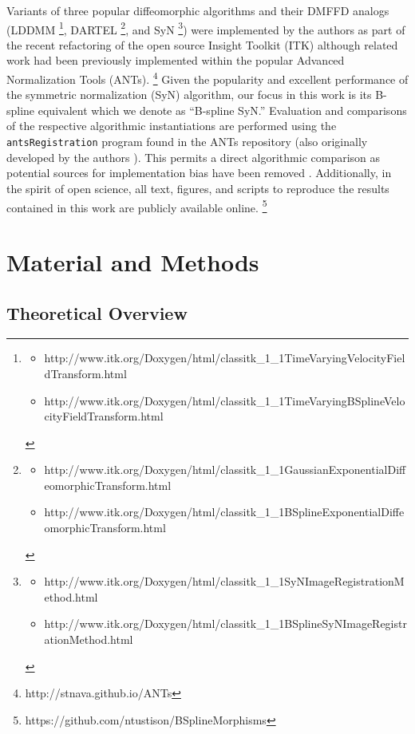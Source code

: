 \documentclass{frontiersSCNS}
\begin{document}
Variants of three popular diffeomorphic algorithms and their DMFFD analogs
(LDDMM%
\footnote{
\begin{itemize}
\item http://www.itk.org/Doxygen/html/classitk\_1\_1TimeVaryingVelocityFieldTransform.html
\item http://www.itk.org/Doxygen/html/classitk\_1\_1TimeVaryingBSplineVelocityFieldTransform.html
\end{itemize}
},
DARTEL%
\footnote{
\begin{itemize}
\item http://www.itk.org/Doxygen/html/classitk\_1\_1GaussianExponentialDiffeomorphicTransform.html
\item http://www.itk.org/Doxygen/html/classitk\_1\_1BSplineExponentialDiffeomorphicTransform.html
\end{itemize}
},
 and SyN%
\footnote{
\begin{itemize}
\item http://www.itk.org/Doxygen/html/classitk\_1\_1SyNImageRegistrationMethod.html
\item http://www.itk.org/Doxygen/html/classitk\_1\_1BSplineSyNImageRegistrationMethod.html
\end{itemize}
})
were implemented by the authors
as part of the recent refactoring of the open source
Insight Toolkit (ITK) although related work had been
previously implemented within the popular Advanced
Normalization Tools (ANTs).%
\footnote{
http://stnava.github.io/ANTs
}
Given the popularity and excellent performance of the symmetric normalization (SyN) algorithm, our focus in this work is
its B-spline equivalent which we denote as ``B-spline SyN.''
Evaluation and comparisons of the respective algorithmic instantiations
are performed using the \verb#antsRegistration# program found
in the ANTs repository (also originally developed by the authors \citep{tustison2012}).  This permits a direct algorithmic comparison
as potential sources for implementation bias have been removed \citep{tustison2013}.  Additionally, in the spirit of open science,
all text, figures, and
scripts to reproduce the results contained in this work are publicly available online.%
\footnote{
https://github.com/ntustison/BSplineMorphisms
}

\section{Material and Methods}

\subsection{Theoretical Overview}
\end{document}
